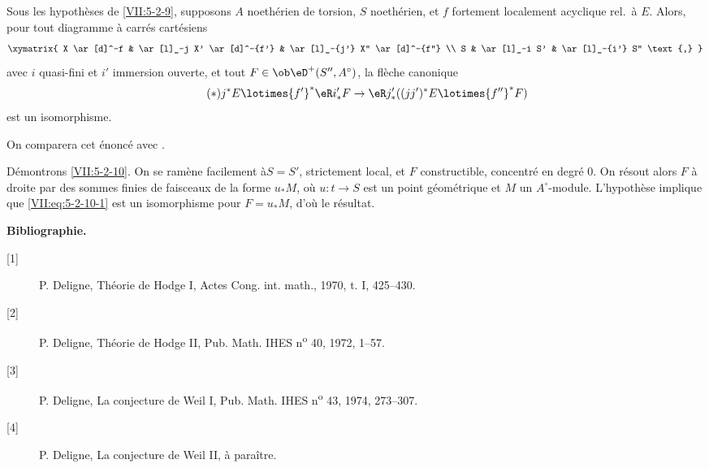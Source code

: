 \begin{proposition}\label{VII:5-2-10}
Sous les hypothèses de \ref{VII:5-2-9}, supposons $A$ noethérien de 
torsion, $S$ noethérien, et $f$ fortement localement acyclique rel.\ à $E$. 
Alors, pour tout diagramme à carrés cartésiens 
\[\xymatrix{
  X \ar[d]^-f 
    & \ar[l]_-j X' \ar[d]^-{f'} 
    & \ar[l]_-{j'} X'' \ar[d]^-{f''} \\
  S 
    & \ar[l]_-i S' 
    & \ar[l]_-{i'} S'' \text{,} 
}\]
avec $i$ quasi-fini et $i'$ immersion ouverte, et tout 
$F\in\ob\eD^+(S'',A^\circ)$, la flèche canonique 
\begin{equation*}\tag{$*$}\label{VII:eq:5-2-10-1}
  j^\ast E \lotimes {f'}^\ast \eR i_\ast' F \to \eR j_\ast' ((j j')^\ast E\lotimes {f''}^\ast F) 
\end{equation*}
est un isomorphisme. 
\end{proposition}

On comparera cet énoncé avec \cite[XV 1.17]{sga4}. 

Démontrons \ref{VII:5-2-10}. On se ramène facilement à$S=S'$, 
strictement local, et $F$ constructible, concentré en degré $0$. On 
résout alors $F$ à droite par des sommes finies de faisceaux de la forme 
$u_\ast M$, où $u:t\to S$ est un point géométrique et $M$ un 
$A^\circ$-module. L'hypothèse implique que \eqref{VII:eq:5-2-10-1} est un 
isomorphisme pour $F=u_\ast M$, d'où le résultat. 





\begin{center}\textbf{Bibliographie.}\end{center}
\begin{description}
\item[{[1]}] P. Deligne, Théorie de Hodge I, Actes Cong. int. math., 1970, t. I, 425--430.
\item[{[2]}] P. Deligne, Théorie de Hodge II, Pub. Math. IHES n\textsuperscript{o} 40, 1972, 1--57.
\item[{[3]}] P. Deligne, La conjecture de Weil I, Pub. Math. IHES n\textsuperscript{o} 43, 1974, 273--307.
\item[{[4]}] P. Deligne, La conjecture de Weil II, à paraître.
\end{description}
